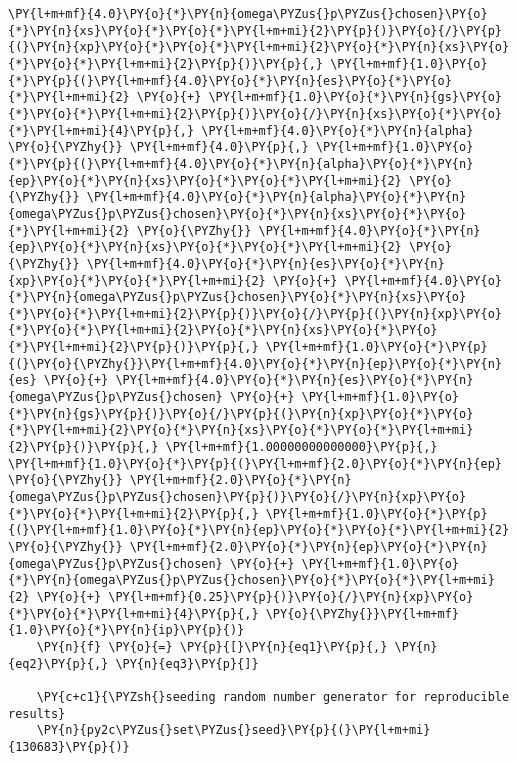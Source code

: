\begin{Verbatim}[commandchars=\\\{\}]
\PY{l+m+mf}{4.0}\PY{o}{*}\PY{n}{omega\PYZus{}p\PYZus{}chosen}\PY{o}{*}\PY{n}{xs}\PY{o}{*}\PY{o}{*}\PY{l+m+mi}{2}\PY{p}{)}\PY{o}{/}\PY{p}{(}\PY{n}{xp}\PY{o}{*}\PY{o}{*}\PY{l+m+mi}{2}\PY{o}{*}\PY{n}{xs}\PY{o}{*}\PY{o}{*}\PY{l+m+mi}{2}\PY{p}{)}\PY{p}{,} \PY{l+m+mf}{1.0}\PY{o}{*}\PY{p}{(}\PY{l+m+mf}{4.0}\PY{o}{*}\PY{n}{es}\PY{o}{*}\PY{o}{*}\PY{l+m+mi}{2} \PY{o}{+} \PY{l+m+mf}{1.0}\PY{o}{*}\PY{n}{gs}\PY{o}{*}\PY{o}{*}\PY{l+m+mi}{2}\PY{p}{)}\PY{o}{/}\PY{n}{xs}\PY{o}{*}\PY{o}{*}\PY{l+m+mi}{4}\PY{p}{,} \PY{l+m+mf}{4.0}\PY{o}{*}\PY{n}{alpha} \PY{o}{\PYZhy{}} \PY{l+m+mf}{4.0}\PY{p}{,} \PY{l+m+mf}{1.0}\PY{o}{*}\PY{p}{(}\PY{l+m+mf}{4.0}\PY{o}{*}\PY{n}{alpha}\PY{o}{*}\PY{n}{ep}\PY{o}{*}\PY{n}{xs}\PY{o}{*}\PY{o}{*}\PY{l+m+mi}{2} \PY{o}{\PYZhy{}} \PY{l+m+mf}{4.0}\PY{o}{*}\PY{n}{alpha}\PY{o}{*}\PY{n}{omega\PYZus{}p\PYZus{}chosen}\PY{o}{*}\PY{n}{xs}\PY{o}{*}\PY{o}{*}\PY{l+m+mi}{2} \PY{o}{\PYZhy{}} \PY{l+m+mf}{4.0}\PY{o}{*}\PY{n}{ep}\PY{o}{*}\PY{n}{xs}\PY{o}{*}\PY{o}{*}\PY{l+m+mi}{2} \PY{o}{\PYZhy{}} \PY{l+m+mf}{4.0}\PY{o}{*}\PY{n}{es}\PY{o}{*}\PY{n}{xp}\PY{o}{*}\PY{o}{*}\PY{l+m+mi}{2} \PY{o}{+} \PY{l+m+mf}{4.0}\PY{o}{*}\PY{n}{omega\PYZus{}p\PYZus{}chosen}\PY{o}{*}\PY{n}{xs}\PY{o}{*}\PY{o}{*}\PY{l+m+mi}{2}\PY{p}{)}\PY{o}{/}\PY{p}{(}\PY{n}{xp}\PY{o}{*}\PY{o}{*}\PY{l+m+mi}{2}\PY{o}{*}\PY{n}{xs}\PY{o}{*}\PY{o}{*}\PY{l+m+mi}{2}\PY{p}{)}\PY{p}{,} \PY{l+m+mf}{1.0}\PY{o}{*}\PY{p}{(}\PY{o}{\PYZhy{}}\PY{l+m+mf}{4.0}\PY{o}{*}\PY{n}{ep}\PY{o}{*}\PY{n}{es} \PY{o}{+} \PY{l+m+mf}{4.0}\PY{o}{*}\PY{n}{es}\PY{o}{*}\PY{n}{omega\PYZus{}p\PYZus{}chosen} \PY{o}{+} \PY{l+m+mf}{1.0}\PY{o}{*}\PY{n}{gs}\PY{p}{)}\PY{o}{/}\PY{p}{(}\PY{n}{xp}\PY{o}{*}\PY{o}{*}\PY{l+m+mi}{2}\PY{o}{*}\PY{n}{xs}\PY{o}{*}\PY{o}{*}\PY{l+m+mi}{2}\PY{p}{)}\PY{p}{,} \PY{l+m+mf}{1.00000000000000}\PY{p}{,} \PY{l+m+mf}{1.0}\PY{o}{*}\PY{p}{(}\PY{l+m+mf}{2.0}\PY{o}{*}\PY{n}{ep} \PY{o}{\PYZhy{}} \PY{l+m+mf}{2.0}\PY{o}{*}\PY{n}{omega\PYZus{}p\PYZus{}chosen}\PY{p}{)}\PY{o}{/}\PY{n}{xp}\PY{o}{*}\PY{o}{*}\PY{l+m+mi}{2}\PY{p}{,} \PY{l+m+mf}{1.0}\PY{o}{*}\PY{p}{(}\PY{l+m+mf}{1.0}\PY{o}{*}\PY{n}{ep}\PY{o}{*}\PY{o}{*}\PY{l+m+mi}{2} \PY{o}{\PYZhy{}} \PY{l+m+mf}{2.0}\PY{o}{*}\PY{n}{ep}\PY{o}{*}\PY{n}{omega\PYZus{}p\PYZus{}chosen} \PY{o}{+} \PY{l+m+mf}{1.0}\PY{o}{*}\PY{n}{omega\PYZus{}p\PYZus{}chosen}\PY{o}{*}\PY{o}{*}\PY{l+m+mi}{2} \PY{o}{+} \PY{l+m+mf}{0.25}\PY{p}{)}\PY{o}{/}\PY{n}{xp}\PY{o}{*}\PY{o}{*}\PY{l+m+mi}{4}\PY{p}{,} \PY{o}{\PYZhy{}}\PY{l+m+mf}{1.0}\PY{o}{*}\PY{n}{ip}\PY{p}{)}
    \PY{n}{f} \PY{o}{=} \PY{p}{[}\PY{n}{eq1}\PY{p}{,} \PY{n}{eq2}\PY{p}{,} \PY{n}{eq3}\PY{p}{]}
    
    \PY{c+c1}{\PYZsh{}seeding random number generator for reproducible results}
    \PY{n}{py2c\PYZus{}set\PYZus{}seed}\PY{p}{(}\PY{l+m+mi}{130683}\PY{p}{)}
    

\end{Verbatim}
